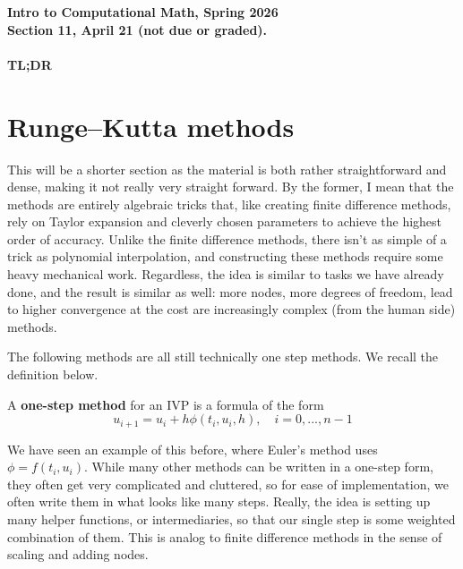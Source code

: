 \documentclass[11pt]{article}
\begin{document}
\begin{center}
{\bf Intro to Computational Math, Spring 2026\\
Section 11, April 21 (not due or graded).\\
}
\end{center}

\paragraph{TL;DR}

\newpage
\section{Runge–Kutta methods}

This will be a shorter section as the material is both rather straightforward and dense, making it not really very straight forward. By the former, I mean that the methods are entirely algebraic tricks that, like creating finite difference methods, rely on Taylor expansion and cleverly chosen parameters to achieve the highest order of accuracy. Unlike the finite difference methods, there isn't as simple of a trick as polynomial interpolation, and constructing these methods require some heavy mechanical work. Regardless, the idea is similar to tasks we have already done, and the result is similar as well: more nodes, more degrees of freedom, lead to higher convergence at the cost are increasingly complex (from the human side) methods.

The following methods are all still technically one step methods. We recall the definition below.

\begin{definition}
    A \textbf{one-step method} for an IVP is a formula of the form $$u_{i+1} = u_i + h\phi(t_i, u_i, h), \quad i = 0, ..., n-1$$
\end{definition}
We have seen an  example of this before, where Euler's method uses $\phi = f(t_i, u_i)$. While many other methods can be written in a one-step form, they often get very complicated and cluttered, so for ease of implementation, we often write them in what looks like many steps. Really, the idea is setting up many helper functions, or intermediaries, so that our single step is some weighted combination of them. This is analog to finite difference methods in the sense of scaling and adding nodes. 
\end{document}
